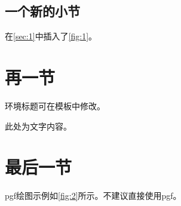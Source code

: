 \documentclass[]{templateWYC}
\begin{document}
		\subsection{一个新的小节}
		在\cref{sec:1}中插入了\cref{fig:1}。

	\section{再一节}
		\begin{problem}[一种box示例]
			环境标题可在模板中修改。
		\end{problem}
		
		\begin{notice}[另一种box示例]
			此处为文字内容。
		\end{notice}

	\section{最后一节}
	pgf绘图示例如\cref{fig:2}所示。不建议直接使用pgf。
\end{document}
